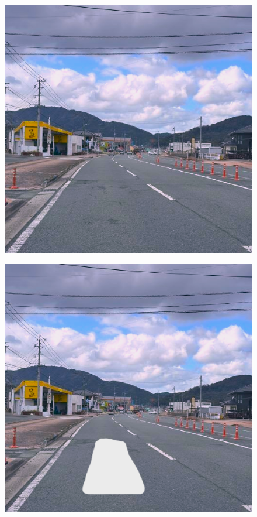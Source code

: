 \documentclass[paper]{ieicej}
\begin{document}
\begin{figure}[tb]
  \begin{minipage}[]{0.32\columnwidth}
    \centering
    \includegraphics[width=0.9\columnwidth]{figures/Ex_pr1.png}
    \label{fig:2-3-2}
  \end{minipage}
  \begin{minipage}[]{0.32\linewidth}
    \centering
    \includegraphics[width=0.9\columnwidth]{figures/Ex_pr2.png}

\end{minipage}
\end{figure}
\end{document}
